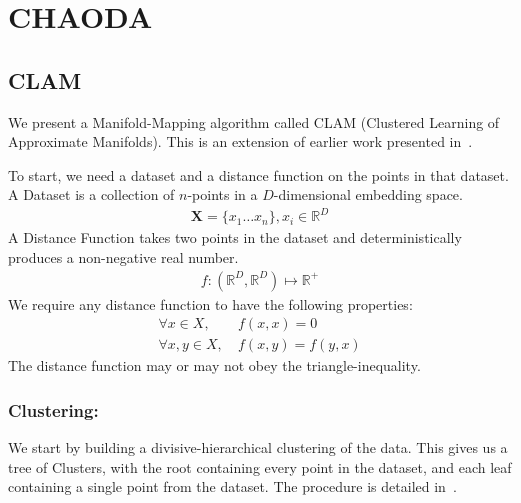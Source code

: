 \section{CHAODA}
\label{sec:chaoda}

\subsection{CLAM}
\label{subsec:chaoda:clam}

We present a Manifold-Mapping algorithm called CLAM (Clustered Learning of Approximate Manifolds).
This is an extension of earlier work presented in~\cite{ishaq2019entropy}.

To start, we need a dataset and a distance function on the points in that dataset.
A Dataset is a collection of $n$-points in a $D$-dimensional embedding space.
\begin{gather*}
    \textbf{X} = \{x_1 \dots x_n\}, x_i \in \mathbb{R}^D
\end{gather*}
A Distance Function takes two points in the dataset and deterministically produces a non-negative real number.
\begin{gather*}
    f : (\mathbb{R}^D, \mathbb{R}^D) \mapsto \mathbb{R}^+
\end{gather*}
We require any distance function to have the following properties:
\begin{align*}
    \forall x \in X, & \ f(x, x) = 0 \\
    \forall x, y \in X, & \ f(x, y) = f(y, x)
\end{align*}
The distance function may or may not obey the triangle-inequality.

\subsubsection*{Clustering:}
\label{subsubsec:chaoda:clam:clustering}
We start by building a divisive-hierarchical clustering of the data.
This gives us a tree of Clusters, with the root containing every point in the dataset, and each leaf containing a single point from the dataset.
The procedure is detailed in~\cite{ishaq2019entropy}.

